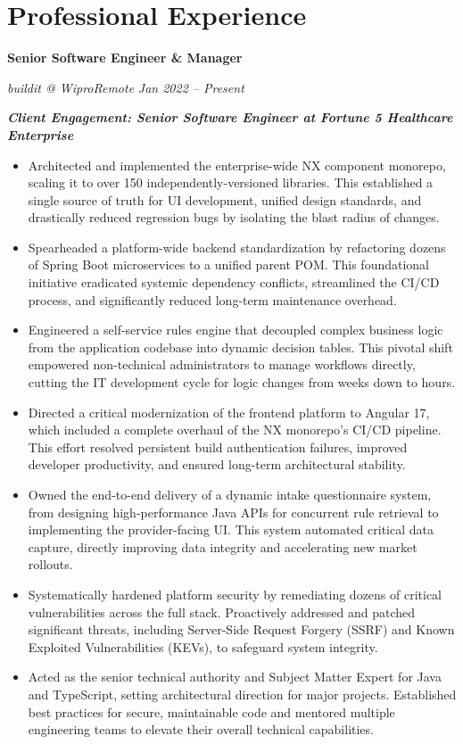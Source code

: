 \documentclass[11pt,letterpaper]{article}
\newlength{\spacingAfterJobHeader}       \setlength{\spacingAfterJobHeader}{0.8em}
\newcommand{\jobtitle}[4]{%
  \noindent%
  {\bfseries\large #1}\par%
  \vspace{0.2em}%
  \textcolor{colorSubtle}{%
    \textit{#2\enspace\textbullet\enspace#3}%
    \hfill%
    \textit{\small #4}%
  }\par%
  \vspace{\spacingAfterJobHeader}%
}
\newcommand{\clientrole}[1]{%
  \vspace{-4pt}\noindent%
  \textcolor{colorSubtle}{\small\bfseries\textit{#1}}\par%
  \vspace{2pt}%
}
\begin{document}
\section*{Professional Experience}

\jobtitle{Senior Software Engineer \& Manager}{buildit @ Wipro}{Remote}{Jan 2022 -- Present}
\clientrole{Client Engagement: Senior Software Engineer at Fortune 5 Healthcare Enterprise}
\begin{itemize}
    \item Architected and implemented the enterprise-wide NX component monorepo, scaling it to over 150 independently-versioned libraries. This established a single source of truth for UI development, unified design standards, and drastically reduced regression bugs by isolating the blast radius of changes.
    \item Spearheaded a platform-wide backend standardization by refactoring dozens of Spring Boot microservices to a unified parent POM. This foundational initiative eradicated systemic dependency conflicts, streamlined the CI/CD process, and significantly reduced long-term maintenance overhead.
    \item Engineered a self-service rules engine that decoupled complex business logic from the application codebase into dynamic decision tables. This pivotal shift empowered non-technical administrators to manage workflows directly, cutting the IT development cycle for logic changes from weeks down to hours.
    \item Directed a critical modernization of the frontend platform to Angular 17, which included a complete overhaul of the NX monorepo's CI/CD pipeline. This effort resolved persistent build authentication failures, improved developer productivity, and ensured long-term architectural stability.
    \item Owned the end-to-end delivery of a dynamic intake questionnaire system, from designing high-performance Java APIs for concurrent rule retrieval to implementing the provider-facing UI. This system automated critical data capture, directly improving data integrity and accelerating new market rollouts.
    \item Systematically hardened platform security by remediating dozens of critical vulnerabilities across the full stack. Proactively addressed and patched significant threats, including Server-Side Request Forgery (SSRF) and Known Exploited Vulnerabilities (KEVs), to safeguard system integrity.
    \item Acted as the senior technical authority and Subject Matter Expert for Java and TypeScript, setting architectural direction for major projects. Established best practices for secure, maintainable code and mentored multiple engineering teams to elevate their overall technical capabilities.
\end{itemize}
\end{document}
